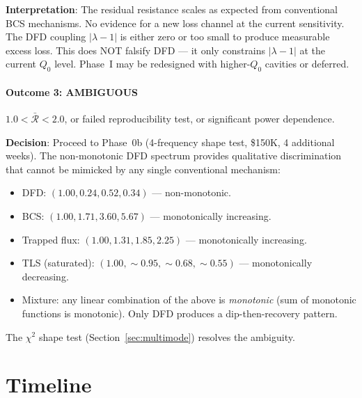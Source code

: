 \documentclass[11pt]{article}
\theoremstyle{definition}
\theoremstyle{remark}
\begin{document}
\begin{tcolorbox}[colback=green!5!white, colframe=green!60!black,
  title=\textbf{PHASE 0a DECISION FRAMEWORK}, breakable]
\textbf{Interpretation}: The residual resistance scales as expected
from conventional BCS mechanisms. No evidence for a new loss channel
at the current sensitivity. The DFD coupling $|\lambda - 1|$ is
either zero or too small to produce measurable excess loss. This
does NOT falsify DFD --- it only constrains $|\lambda - 1|$ at the
current $Q_0$ level. Phase~I may be redesigned with higher-$Q_0$
cavities or deferred.

\subsection*{Outcome 3: AMBIGUOUS}

$1.0 < \bar{\mathcal{R}} < 2.0$, or failed reproducibility test,
or significant power dependence.

\textbf{Decision}: Proceed to Phase~0b (4-frequency shape test,
\$150K, 4 additional weeks). The non-monotonic DFD spectrum
provides qualitative discrimination that cannot be mimicked by
any single conventional mechanism:
\begin{itemize}[nosep]
\item DFD: $(1.00, 0.24, 0.52, 0.34)$ --- non-monotonic.
\item BCS: $(1.00, 1.71, 3.60, 5.67)$ --- monotonically increasing.
\item Trapped flux: $(1.00, 1.31, 1.85, 2.25)$ --- monotonically
  increasing.
\item TLS (saturated): $(1.00, \sim 0.95, \sim 0.68, \sim 0.55)$
  --- monotonically decreasing.
\item Mixture: any linear combination of the above is
  \emph{monotonic} (sum of monotonic functions is monotonic).
  Only DFD produces a dip-then-recovery pattern.
\end{itemize}

The $\chi^2$ shape test (Section~\ref{sec:multimode}) resolves the
ambiguity.

\end{tcolorbox}


\part{Timeline}
\label{sec:timeline}
\end{document}

